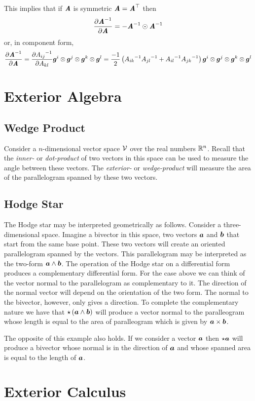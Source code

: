 This implies that if $\boldsymbol{\mathit{A}}$ is symmetric \ie
$\boldsymbol{\mathit{A}}= {\boldsymbol{\mathit{A}}}^{ \top } $ then
\begin{equation}
  \delby{\inverse{\tensortwo{A}}}{\tensortwo{A}}=\symtensorprod{-\inverse{\tensortwo{A}}}{\inverse{\tensortwo{A}}}
  \label{eqn:DerivInverseSymmetricTensorSecondOrder}
\end{equation}
or, in component form,
\begin{equation}
   \dfrac{\partial {\ensuremath{\boldsymbol{\mathit{A}}}}^{-1}}{\partial \boldsymbol{\mathit{A}}} = \dfrac{\partial {A_{ij}}^{-1}}{\partial A_{kl}}   \boldsymbol{g} ^{i} \otimes  \boldsymbol{g} ^{j} \otimes  \boldsymbol{g} ^{k} \otimes  \boldsymbol{g} ^{l} =\dfrac{-1}{2}\left( {A_{ik}}^{-1}{A_{jl}}^{-1}+{A_{il}}^{-1}{A_{jk}}^{-1} \right)  \boldsymbol{g} ^{i} \otimes  \boldsymbol{g} ^{j} \otimes  \boldsymbol{g} ^{k} \otimes  \boldsymbol{g} ^{l} 
\end{equation}


\section{Exterior Algebra}
\label{sec:ExteriorAlgebra}

\subsection{Wedge Product}
\label{subsec:WedgeProduct}

Consider a $n$-dimensional vector space $ \mathcal{V} $ over the real
numbers $\rntopology{n}$. Recall that the \emph{inner-} or \emph{dot-product}
of two vectors in this space can be used to measure the angle between these
vectors. The \emph{exterior-} or \emph{wedge-product} will measure the area of
the parallelogram spanned by these two vectors. 

\subsection{Hodge Star}
\label{subsec:HodgeStar}

The Hodge star may be interpreted geometrically as follows. Consider a
three-dimensional space. Imagine a bivector in this space, \ie two vectors
$ \boldsymbol{a} $ and $ \boldsymbol{b} $ that start from the same base point. These two
vectors will create an oriented parallelogram spanned by the vectors. This
parallelogram may be interpreted as the two-form
$  \boldsymbol{a}  \wedge  \boldsymbol{b}  $. The operation of the Hodge star on a
differential form produces a complementary differential form. For the case
above we can think of the vector normal to the parallelogram as complementary
to it. The direction of the normal vector will depend on the orientation of
the two form. The normal to the bivector, however, only gives a direction. To
complete the complementary nature we have that
$  \star \left(   \boldsymbol{a}  \wedge  \boldsymbol{b}   \right) $ will produce a vector
normal to the paralleogram whose length is equal to the area of paralleogram
which is given by $  \boldsymbol{a}  \times  \boldsymbol{b}  $.

The opposite of this example also holds. If we consider a vector $ \boldsymbol{a} $
then $  \star  \boldsymbol{a}  $ will produce a bivector whose normal is in the
direction of $ \boldsymbol{a} $ and whose spanned area is equal to the length of
$ \boldsymbol{a} $.

\section{Exterior Calculus}
\label{sec:ExteriorCalculus}

